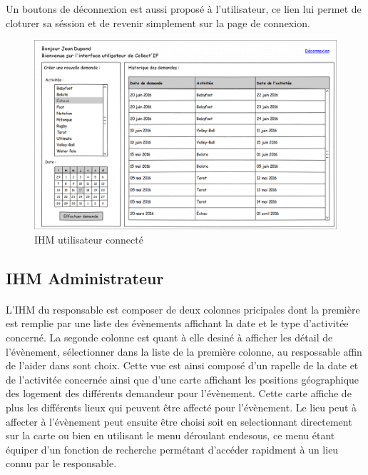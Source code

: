 \documentclass[a4paper,11pt]{article}
\begin{document}
Un boutons de déconnexion est aussi proposé à l'utilisateur, ce lien lui permet de cloturer sa séssion et de revenir simplement sur la page de connexion.

\begin{figure}[H]
  \begin{center}
    \includegraphics[width=15cm]{../../IHM/IHM_utilisateur.png}
    \caption{IHM utilisateur connecté}
  \end{center}
\end{figure}

\pagebreak
\subsection{IHM Administrateur}

\paragraph{}
L'IHM du responsable est composer de deux colonnes pricipales dont la première est remplie par une liste des évènements affichant la date et le type d'activitée concerné. La segonde colonne est quant à elle desiné à afficher les détail de l'évènement, sélectionner dans la liste de la première colonne, au respossable affin de l'aider dans sont choix. Cette vue est ainsi composé d'un rapelle de la date et de l'activitée concernée ainsi que d'une carte affichant les positions géographique des logement des différents demandeur pour l'évènement. Cette carte affiche de plus les différents lieux qui peuvent être affecté pour l'évènement. Le lieu peut à affecter à l'évènement peut ensuite être choisi soit en selectionnant directement sur la carte ou bien en utilisant le menu déroulant endesous, ce menu étant équiper d'un fonction de recherche permétant d'accéder rapidment à un lieu connu par le responsable.
\end{document}
